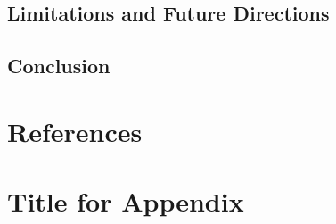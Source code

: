 \documentclass[
  stu,
  longtable,
  nolmodern,
  notxfonts,
  notimes,
  colorlinks=true,linkcolor=blue,citecolor=blue,urlcolor=blue]{apa7}
\begin{document}
\subsection{Limitations and Future
Directions}\label{limitations-and-future-directions}

\subsection{Conclusion}\label{conclusion}

\section{References}\label{references}

\appendix

\section{Title for Appendix}\label{title-for-appendix}
\end{document}
